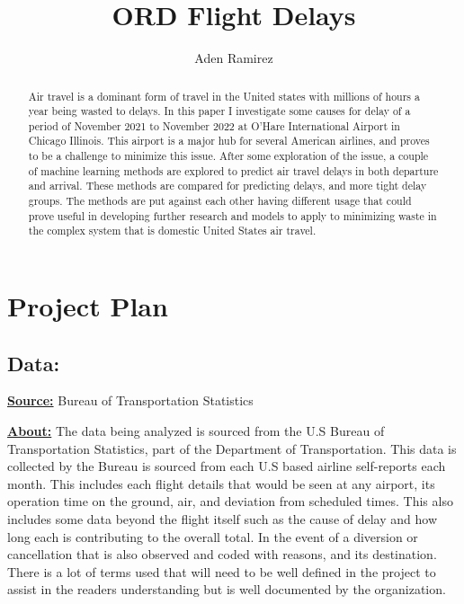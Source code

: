 \documentclass[a4paper,12pt]{article}
\begin{document}
\title{ORD Flight Delays}
\author{Aden Ramirez}
\maketitle

\begin{abstract}

Air travel is a dominant form of travel in the United states with millions of hours a year being wasted to delays.
In this paper I investigate some causes for delay of a period of November 2021 to November 2022 at O'Hare International Airport in
Chicago Illinois. This airport is a major hub for several American airlines, and proves to be a challenge to minimize this issue.
After some exploration of the issue, a couple of machine learning methods are explored to predict air travel delays in both departure and arrival.
These methods are compared for predicting delays, and more tight delay groups. The methods are put against each other having different usage that could prove useful
in developing further research and models to apply to minimizing waste in the complex system that is domestic United States air travel.

\end{abstract}


\pagebreak

\tableofcontents

\pagebreak

\section{Project Plan}

\subsection{Data:}

\textbf{\underline{Source:}} Bureau of Transportation Statistics

\noindent \textbf{\underline{About:}}
The data being analyzed is sourced from the U.S Bureau of Transportation Statistics, part of the
Department of Transportation. This data is collected by the Bureau is sourced from each U.S
based airline self-reports each month. This includes each flight details that would be seen at
any airport, its operation time on the ground, air, and deviation from scheduled times. This also
includes some data beyond the flight itself such as the cause of delay and how long each is
contributing to the overall total. In the event of a diversion or cancellation that is also observed
and coded with reasons, and its destination. There is a lot of terms used that will need to be
well defined in the project to assist in the readers understanding but is well documented by the
organization.
\end{document}
